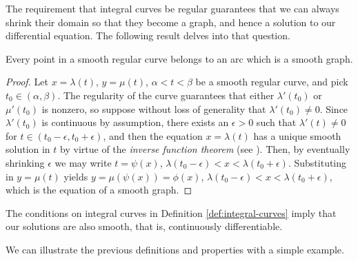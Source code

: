 The requirement that integral curves be regular guarantees that we can always shrink their domain so that they become a graph, and hence a solution to our differential equation. The following result delves into that question.

\begin{prop}
  Every point in a smooth regular curve belongs to an arc which is a smooth graph.
\end{prop}

\begin{proof}
  Let $x=\lambda(t)$, $y=\mu(t)$, $\alpha < t < \beta$ be a smooth regular curve, and pick $t_0 \in (\alpha, \beta)$. The regularity of the curve guarantees that either $\lambda'(t_0)$ or $\mu'(t_0)$ is nonzero, so suppose without loss of generality that $\lambda'(t_0) \neq 0$. Since $\lambda'(t_0)$ is continuous by assumption, there exists an $\epsilon > 0$ such that $\lambda'(t)\neq 0$ for $t \in (t_0 - \epsilon, t_0 + \epsilon)$, and then the equation $x=\lambda(t)$ has a unique smooth solution in $t$ by virtue of the \textit{inverse function theorem} (see \cite[372]{apostol1974analysis}). Then, by eventually shrinking $\epsilon$ we may write $t=\psi(x)$, $\lambda(t_0 - \epsilon) < x < \lambda(t_0 + \epsilon)$. Substituting in $y=\mu(t)$ yields $y=\mu(\psi(x)) = \phi(x)$, $\lambda(t_0 - \epsilon) < x < \lambda(t_0 + \epsilon)$, which is the equation of a smooth graph.
\end{proof}

\begin{remark} The conditions on integral curves in Definition \ref{def:integral-curves} imply that our solutions are also smooth, that is, continuously differentiable.
\end{remark}

We can illustrate the previous definitions and properties with a simple example.

